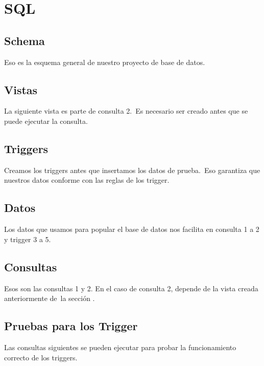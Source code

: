\documentclass[12pt]{article}
\begin{document}
\newpage
\section{SQL}
\label{sec:sql}
\subsection{Schema}
\label{sec:schema}
Eso es la esquema general de nuestro proyecto de base de datos.\\


\newpage
\subsection{Vistas}
\label{sec:vistas}
La siguiente vista es parte de consulta 2.\
Es necesario ser creado antes que se puede ejecutar la consulta.\\


\newpage
\subsection{Triggers}
\label{sec:triggers}
Creamos los triggers antes que insertamos los datos de prueba.\
Eso garantiza que nuestros datos conforme con las reglas de los trigger.\\


\newpage
\subsection{Datos}
\label{sec:datos}
Los datos que usamos para popular el base de datos nos facilita en consulta 1 a 2 y trigger 3 a 5.


\newpage
\subsection{Consultas}
\label{sec:consultas}
Esos son las consultas 1 y 2. En el caso de consulta 2, depende de la vista creada anteriormente de\
la sección .


\newpage
\subsection{Pruebas para los Trigger}
\label{sec:pruebas}
Las consultas siguientes se pueden ejecutar para probar la funcionamiento correcto de los triggers.\\

\end{document}
